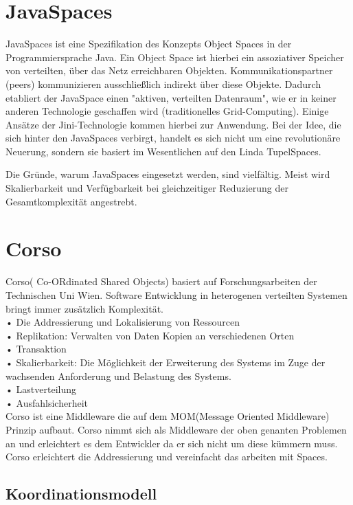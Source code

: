\documentclass[a4paper,12pt]{scrreprt}
\begin{document}
	\section{JavaSpaces}
		JavaSpaces ist eine Spezifikation des Konzepts Object Spaces in der Programmiersprache Java. Ein Object Space ist hierbei ein assoziativer Speicher von verteilten, über das Netz erreichbaren Objekten. Kommunikationspartner (peers) kommunizieren ausschließlich indirekt über diese Objekte. Dadurch etabliert der JavaSpace einen "aktiven, verteilten Datenraum", wie er in keiner anderen Technologie geschaffen wird (traditionelles Grid-Computing). Einige Ansätze der Jini-Technologie kommen hierbei zur Anwendung. Bei der Idee, die sich hinter den JavaSpaces verbirgt, handelt es sich nicht um eine revolutionäre Neuerung, sondern sie basiert im Wesentlichen auf den Linda TupelSpaces.
		
		Die Gründe, warum JavaSpaces eingesetzt werden, sind vielfältig. Meist wird Skalierbarkeit und Verfügbarkeit bei gleichzeitiger Reduzierung der Gesamtkomplexität angestrebt.
		
		
		\section{Corso}
			Corso( Co-ORdinated Shared Objects) basiert auf Forschungsarbeiten der Technischen Uni Wien.
			Software Entwicklung in heterogenen verteilten Systemen bringt immer zusätzlich Komplexität.\\
			•	Die Addressierung und Lokalisierung von Ressourcen\\
			•	Replikation: Verwalten von Daten Kopien an verschiedenen Orten\\
			•	Transaktion\\
			•	Skalierbarkeit: Die Möglichkeit der Erweiterung des Systems im Zuge der wachsenden Anforderung und Belastung des Systems.\\
			•	Lastverteilung\\
			•	Ausfahlsicherheit\\
			Corso ist eine Middleware die auf dem MOM(Message Oriented Middleware) Prinzip aufbaut. Corso nimmt sich als Middleware der oben genanten Problemen an und erleichtert es dem Entwickler da er sich nicht um diese kümmern muss. Corso erleichtert die Addressierung und vereinfacht das arbeiten mit Spaces.\\
			
			\subsection{Koordinationsmodell}
			
\end{document}

